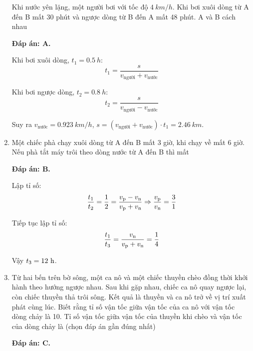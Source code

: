 \begin{enumerate}[label=\bfseries Câu \arabic*:]
	\cauhoi
	{Khi nước yên lặng, một người bơi với tốc độ $\SI{4}{km/h}$. Khi bơi xuôi dòng từ A đến B mất 30 phút và ngược dòng từ B đến A mất 48 phút. A và B cách nhau
		
	}
	\loigiai
	{	\textbf{Đáp án: A.}
		
	Khi bơi xuôi dòng, $t_1=\SI{0.5}{h}$:
	$$t_1 = \dfrac{s}{v_\text{người} + v_\text{nước}}$$
	
	Khi bơi ngược dòng, $t_2=\SI{0.8}{h}$:
	$$t_2=\dfrac{s}{v_\text{người} - v_\text{nước}}$$
	
	Suy ra $v_\text{nước} = \SI{0.923}{km/h}$, $s=(v_\text{người} + v_\text{nước}) \cdot t_1 = \SI{2.46}{km}$.
	}
	
	

	\item {}
	
	\cauhoi
	{Một chiếc phà chạy xuôi dòng từ A đến B mất 3 giờ, khi chạy về mất 6 giờ. Nếu phà tắt máy trôi theo dòng nước từ A đến B thì mất
	}
	\loigiai
	{	\textbf{Đáp án: B.}
		
	Lập tỉ số:
	$$\dfrac{t_1}{t_2} = \dfrac{1}{2} = \dfrac{v_\text p - v_\text n}{v_\text p + v_\text n} \Rightarrow \dfrac{v_\text p}{v_\text n} = \dfrac{3}{1}$$
	
	Tiếp tục lập tỉ số:
	$$\dfrac{t_1}{t_3} = \dfrac{v_\text n}{v_\text p + v_\text n} = \dfrac{1}{4}$$
	
	Vậy $t_3=12\ \text h$.
	}

	\item {}
	
	\cauhoi
	{Từ hai bến trên bờ sông, một ca nô và một chiếc thuyền chèo đồng thời khởi hành theo hướng ngược nhau. Sau khi gặp nhau, chiếc ca nô quay ngược lại, còn chiếc thuyền thả trôi sông. Kết quả là thuyền và ca nô trở về vị trí xuất phát cùng lúc. Biết rằng tỉ số vận tốc giữa vận tốc của ca nô với vận tốc dòng chảy là 10. Tỉ số vận tốc giữa vận tốc của thuyền khi chèo và vận tốc của dòng chảy là (chọn đáp án gần đúng nhất)
	}
	\loigiai
	{	\textbf{Đáp án: C.}
		
}
\end{enumerate}
